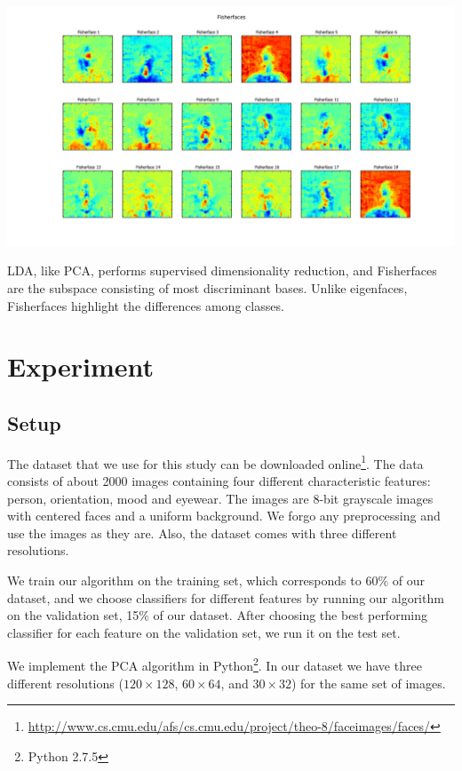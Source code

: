\documentclass{article} %
\begin{document}
\begin{minipage}{\linewidth}
	\centering
	\includegraphics[width=1.0\linewidth]{fig/fisherfaces.pdf}
	\label{fig:fisherfaces}
\end{minipage}

LDA, like PCA, performs supervised dimensionality reduction, and Fisherfaces are the subspace consisting of most discriminant bases.  Unlike eigenfaces, Fisherfaces highlight the differences among classes\cite{bel97}. 

\section{Experiment}

\subsection{Setup}

The dataset that we use for this study can be downloaded online\footnote{\url{http://www.cs.cmu.edu/afs/cs.cmu.edu/project/theo-8/faceimages/faces/}}. The data consists of about 2000 images containing four different characteristic features: person, orientation, mood and eyewear.  The images are 8-bit grayscale images with centered faces and a uniform background.  We forgo any preprocessing and use the images as they are. Also, the dataset comes with three different resolutions.

We train our algorithm on the training set, which corresponds to 60\% of our dataset, and we choose classifiers for different features by running our algorithm on the validation set, 15\% of our dataset. After choosing the best performing classifier for each feature on the validation set, we run it on the test set.

We implement the PCA algorithm in Python\footnote{Python 2.7.5}. In our dataset we have three different resolutions ($120\times128$, $60\times64$, and $30\times32$) for the same set of images.  
\end{document}
